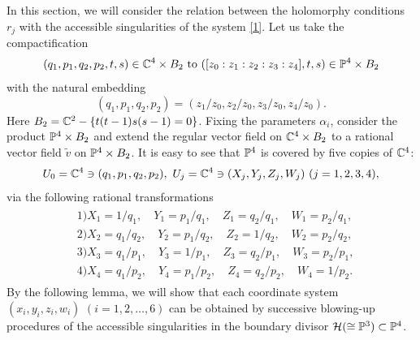 In this section, we will consider the relation between the holomorphy conditions $r_j$  with the accessible singularities of the system \eqref{1}. Let us take the compactification
\begin{equation*}
(q_1,p_1,q_2,p_2,t,s) \in {\Bbb C}^4 \times B_2 \  {\rm{to\rm}} \ ([z_0:z_1:z_2:z_3:z_4],t,s) \in {\Bbb P}^4 \times B_2
\end{equation*}
with the natural embedding
\begin{equation*}
(q_1,p_1,q_2,p_2)=(z_1/z_0,z_2/z_0,z_3/z_0,z_4/z_0).
\end{equation*}
Here $B_2={\Bbb C}^2-\{t(t-1)s(s-1)=0 \}$. Fixing the parameters $\alpha_i$, consider the product ${\Bbb P}^4 \times B_2$ and extend the regular vector field on ${\Bbb C}^4 \times B_2$ to a rational vector field $\tilde{v}$ on ${\Bbb P}^4 \times B_2$. It is easy to see that ${\Bbb P}^4$ is covered by five copies of ${\Bbb C}^4${\rm : \rm}
$$
U_0={\Bbb C}^4 \ni (q_1,p_1,q_2,p_2), \ U_j={\Bbb C}^4 \ni (X_j,Y_j,Z_j,W_j) \ (j=1,2,3,4),
$$
via the following rational transformations
\begin{align}\label{coverofP4}
\begin{split}
&1)  X_1=1/q_1, \quad Y_1=p_1/q_1, \quad Z_1=q_2/q_1, \quad W_1=p_2/q_1,\\
&2)  X_2=q_1/q_2, \quad Y_2=p_1/q_2, \quad Z_2=1/q_2, \quad W_2=p_2/q_2,\\
&3)  X_3=q_1/p_1, \quad Y_3=1/p_1, \quad Z_3=q_2/p_1, \quad W_3=p_2/p_1,\\
&4)  X_4=q_1/p_2, \quad Y_4=p_1/p_2, \quad Z_4=q_2/p_2, \quad W_4=1/p_2.
\end{split}
\end{align}
By the following lemma, we will show that each coordinate system $(x_i,y_i,z_i,w_i)$ $(i=1,2,\dots,6)$ can be obtained by successive blowing-up procedures of the accessible singularities in the boundary divisor ${\mathcal H} (\cong {\Bbb P}^3) \subset {\Bbb P}^4$.



